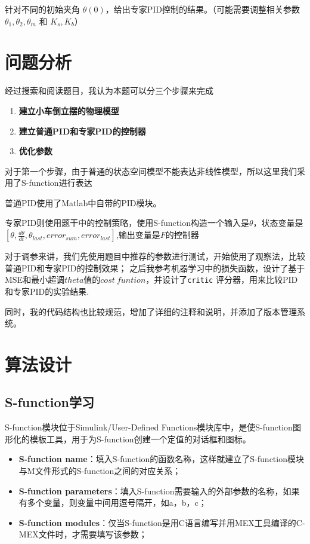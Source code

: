 \documentclass[12pt,a4paper,UTF8]{article}
\begin{document}
\begin{problem}
针对不同的初始夹角 $\theta(0)$，给出专家PID控制的结果。（可能需要调整相关参数 $\theta_1, \theta_2, \theta_m$ 和 $K_s, K_b$）
\end{problem}

\section{问题分析}

经过搜索和阅读题目，我认为本题可以分三个步骤来完成

\begin{enumerate}
    \item \textbf{建立小车倒立摆的物理模型}
    \item \textbf{建立普通PID和专家PID的控制器}
    \item \textbf{优化参数}
\end{enumerate}

对于第一个步骤，由于普通的状态空间模型不能表达非线性模型，所以这里我们采用了S-function进行表达

普通PID使用了Matlab中自带的PID模块。

专家PID则使用题干中的控制策略，使用S-function构造一个输入是$\theta$，状态变量是$[\theta, \frac{d\theta}{dt}, \theta_{last}, error_{sum}, error_{last}]$,输出变量是$F$的控制器 

对于调参来讲，我们先使用题目中推荐的参数进行测试，开始使用了观察法，比较普通PID和专家PID的控制效果；
之后我参考机器学习中的损失函数，设计了基于MSE和最小超调$theta$值的$cost\ funtion$，并设计了\texttt{critic} 评分器，用来比较PID和专家PID的实验结果.

同时，我的代码结构也比较规范，增加了详细的注释和说明，并添加了版本管理系统。

\clearpage %
\section{算法设计}


\subsection{S-function学习}

S-function模块位于Simulink/User-Defined Functions模块库中，是使S-function图形化的模板工具，用于为S-function创建一个定值的对话框和图标。


\begin{itemize}
    \item \textbf{S-function name}：填入S-function的函数名称，这样就建立了S-function模块与M文件形式的S-function之间的对应关系；
    \item \textbf{S-function parameters}：填入S-function需要输入的外部参数的名称，如果有多个变量，则变量中间用逗号隔开，如a，b，c；
    \item \textbf{S-function modules}：仅当S-function是用C语言编写并用MEX工具编译的C-MEX文件时，才需要填写该参数；
\end{itemize}
\end{document}
